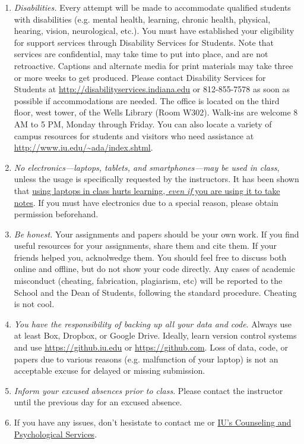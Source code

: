 \documentclass[11pt,article,oneside]{memoir} %
\begin{document}
\begin{enumerate}%

\item \emph{Disabilities.} Every attempt will be made to accommodate qualified
students with disabilities (e.g. mental health, learning, chronic health,
physical, hearing, vision, neurological, etc.). You must have established your
eligibility for support services through Disability Services for Students. Note
that services are confidential, may take time to put into place, and are not
retroactive.  Captions and alternate media for print materials may take three
or more weeks to get produced. Please contact Disability Services for Students
at \url{http://disabilityservices.indiana.edu} or 812-855-7578 as soon as
possible if accommodations are needed. The office is located on the third
floor, west tower, of the Wells Library (Room W302). Walk-ins are welcome 8 AM
to 5 PM, Monday through Friday. You can also locate a variety of campus
resources for students and visitors who need assistance at
\url{http://www.iu.edu/~ada/index.shtml}. 

\item \emph{No electronics---laptops, tablets, and smartphones---may be used in
class}, unless the usage is specifically requested by the instructors.  It has
been shown that
\href{http://www.scientificamerican.com/article/a-learning-secret-don-t-take-notes-with-a-laptop/}{using
laptops in class hurts learning, \emph{even if} you are using it to take
notes}.  If you must have electronics due to a special reason, please obtain
permission beforehand. 

\item \emph{Be honest.} Your assignments and papers should be your own work.
If you find useful resources for your assignments, share them and cite them. If
your friends helped you, acknolwedge them. You should feel free to discuss both
online and offline, but do not show your code directly.  Any cases of academic
misconduct (cheating, fabrication, plagiarism, etc) will be reported to the
School and the Dean of Students, following the standard procedure. Cheating is
not cool. 

\item \emph{You have the responsibility of backing up all your data and code}.
Always use at least Box, Dropbox, or Google Drive. Ideally, learn version
control systems and use \url{https://github.iu.edu} or
\url{https://github.com}. Loss of data, code, or papers due to various reasons
(e.g. malfunction of your laptop) is not an acceptable excuse for delayed or
missing submission. 

\item \emph{Inform your excused absences prior to class}. Please contact the
instructor until the previous day for an excused absence.  

\item If you have any issues, don't hesistate to contact me or
\href{http://healthcenter.indiana.edu/counseling/index.shtml}{IU's Counseling
and Psychological Services}. 


\end{enumerate}%
\end{document}
